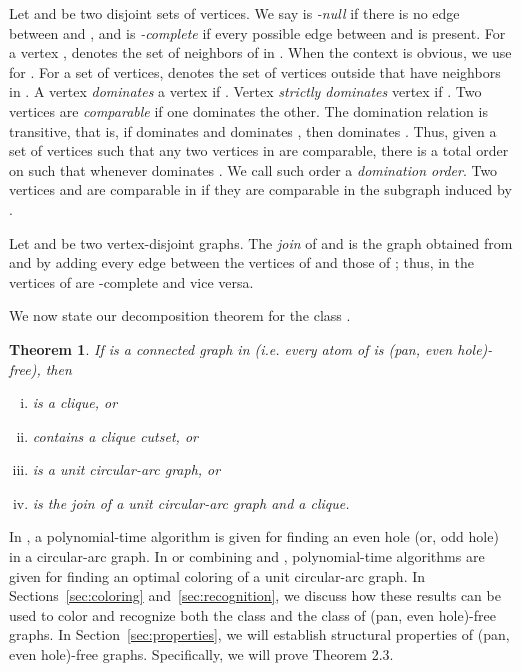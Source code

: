 \documentclass[11pt,a4paper]{article}
\newtheorem{theorem} {Theorem}[section]
\begin{document}
Let  and  be two disjoint sets of vertices. We say  is {\em
-null} if there is no edge between  and , and  is {\em
-complete} if every possible edge between  and  is
present. For a vertex ,  denotes the set of neighbors
of  in . When the context is obvious, we use  for .  For a set  of vertices,  denotes the set of
vertices outside  that have neighbors in . A vertex  {\em
dominates} a vertex  if .
Vertex  {\em strictly dominates} vertex  if . Two vertices are {\em comparable} if one dominates
the other. The domination relation is transitive, that is, if 
dominates  and  dominates , then  dominates . Thus,
given a set  of vertices such that any two vertices in  are
comparable, there is a total order  on  such that  whenever  dominates . We call such order a {\it
domination order}.  Two vertices  and  are comparable in  if
they are comparable in the subgraph induced by .



Let  and  be two vertex-disjoint graphs. The {\em join} of  and
 is the graph  obtained from  and  by adding every
edge between the vertices of  and those of ; thus, in 
the vertices of  are -complete and vice versa.

We now state our decomposition theorem for the class .

\begin{theorem}\label{thm:structure}
If  is a connected graph in  (i.e. every atom of 
is (pan, even hole)-free), then
\begin{enumerate}[(i)]
  \item  is a clique, or
  \item  contains a clique cutset, or
  \item  is  a unit circular-arc graph, or
  \item  is the join of a unit circular-arc graph and a
clique.
\end{enumerate}
\end{theorem}


In \cite{CamEsc2007}, a polynomial-time algorithm is given for
finding an even hole (or, odd hole) in a circular-arc graph. In
\cite{OrlBon1991} or combining \cite{LS2008} and \cite{ShihHsu},
polynomial-time algorithms are given for
finding an optimal coloring of a unit circular-arc graph. In
Sections~\ref{sec:coloring} and~\ref{sec:recognition}, we discuss
how these results can be used to color and recognize
both the class  and the class of (pan, even hole)-free graphs.
In Section~\ref{sec:properties}, we will
establish structural properties of (pan, even hole)-free graphs.
Specifically, we will prove Theorem 2.3.
\end{document}
